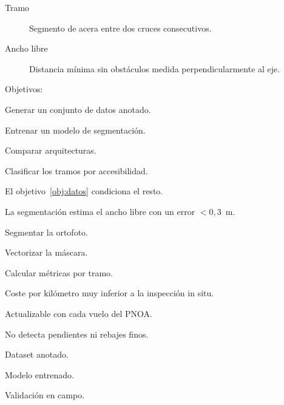 \documentclass[IB]{TFUOC}
\begin{document}
\begin{description}
  \item[Tramo] Segmento de acera entre dos cruces consecutivos.
  \item[Ancho libre] Distancia mínima sin obstáculos medida perpendicularmente al eje.
\end{description}

Objetivos:
\begin{codigos}[O]
  \item Generar un conjunto de datos anotado.\label{obj:datos}
  \item Entrenar un modelo de segmentación.
  \begin{codigos}\item Comparar arquitecturas.\end{codigos}
  \item Clasificar los tramos por accesibilidad.
\end{codigos}
El objetivo~\ref{obj:datos} condiciona el resto.

\begin{codigos}[H]
  \item La segmentación estima el ancho libre con un error $< 0{,}3$~m.
\end{codigos}

\begin{pasos}
  \item Segmentar la ortofoto.
  \item Vectorizar la máscara.
  \item Calcular métricas por tramo.
\end{pasos}

\begin{ventajas}
  \item Coste por kilómetro muy inferior a la inspección in situ.
  \item Actualizable con cada vuelo del PNOA.
\end{ventajas}
\begin{inconvenientes}
  \item No detecta pendientes ni rebajes finos.
\end{inconvenientes}

\begin{comprobacion}
  \item[\hecho] Dataset anotado.
  \item[\parcial] Modelo entrenado.
  \item[\porhacer] Validación en campo.
\end{comprobacion}
\end{document}
